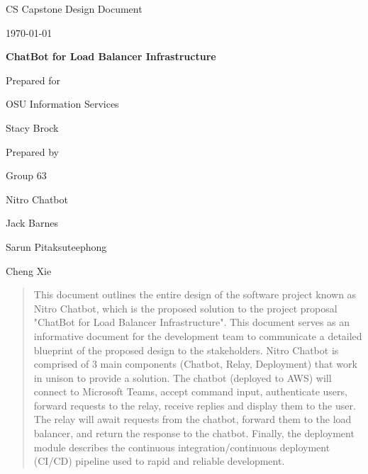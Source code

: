 \documentclass[onecolumn, draftclsnofoot,10pt, compsoc]{IEEEtran}
\def \CapstoneTeamName{		    Nitro Chatbot}
\def \CapstoneTeamNumber{		63}
\def \GroupMemberOne{			Jack Barnes}
\def \GroupMemberTwo{			Sarun Pitaksuteephong}
\def \GroupMemberThree{			Cheng Xie}
\def \CapstoneProjectName{		ChatBot for Load Balancer Infrastructure}
\def \CapstoneSponsorCompany{	OSU Information Services}
\def \CapstoneSponsorPerson{	Stacy Brock}
\def \DocType{	%
				Design Document
				}
\newcommand{\NameSigPair}[1]{\par
\makebox[2.75in][r]{#1} \hfil 	\makebox[3.25in]{\makebox[2.25in]{\hrulefill} \hfill		\makebox[.75in]{\hrulefill}}
\par\vspace{-12pt} \textit{\tiny\noindent
\makebox[2.75in]{} \hfil		\makebox[3.25in]{\makebox[2.25in][r]{Signature} \hfill	\makebox[.75in][r]{Date}}}}
\renewcommand{\NameSigPair}[1]{#1}
\begin{document}
\begin{titlepage}
    \begin{singlespace}
        \hfill 
        \par\vspace{.2in}
        \centering
        \scshape{
            \huge CS Capstone \DocType \par
            {\large\today}\par
            \vspace{.5in}
            \textbf{\Huge\CapstoneProjectName}\par
            \vfill
            \vfill
            {\large Prepared for}\par
            \Huge \CapstoneSponsorCompany\par
            \vspace{5pt}
            {\Large\NameSigPair{\CapstoneSponsorPerson}\par}
            {\large Prepared by }\par
            Group\CapstoneTeamNumber\par
            \CapstoneTeamName\par 
            \vspace{5pt}
            {\Large
                \NameSigPair{\GroupMemberOne}\par
                \NameSigPair{\GroupMemberTwo}\par
                \NameSigPair{\GroupMemberThree}\par
            }
            \vspace{20pt}
        }
        \begin{abstract}
            This document outlines the entire design of the software project known as Nitro Chatbot, which is the proposed solution to the project proposal "ChatBot for Load Balancer Infrastructure".
            This document serves as an informative document for the development team to communicate a detailed blueprint of the proposed design to the stakeholders.
            Nitro Chatbot is comprised of 3 main components (Chatbot, Relay, Deployment) that work in unison to provide a solution.
            The chatbot (deployed to AWS) will connect to Microsoft Teams, accept command input, authenticate users, forward requests to the relay, receive replies and display them to the user.
            The relay will await requests from the chatbot, forward them to the load balancer, and return the response to the chatbot.
            Finally, the deployment module describes the continuous integration/continuous deployment (CI/CD) pipeline used to rapid and reliable development.
        \end{abstract}     
    \end{singlespace}
\end{titlepage}
\end{document}
